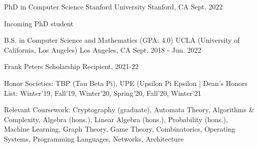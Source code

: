 

\begin{cventries}

\resumeentry
    {PhD in Computer Science} %
    {Stanford University} %
    {Stanford, CA} %
    {Sept. 2022} %
    {
      \begin{cvitems} %
        \item {Incoming PhD student}
      \end{cvitems}
    }

  \resumeentry
    {B.S. in Computer Science and Mathematics (GPA: 4.0)} %
    {UCLA (University of California, Los Angeles)} %
    {Los Angeles, CA} %
    {Sept. 2018 - Jun. 2022} %
    {
      \begin{cvitems} %
        \item {Frank Peters Scholarship Recipient, 2021-22}
        \item {Honor Societies: TBP (Tau Beta Pi), UPE (Upsilon Pi Epsilon | Dean's Honors List: Winter'19, Fall'19, Winter'20, Spring'20, Fall'20, Winter'21}
        \item {Relevant Coursework: Cryptography (graduate), Automata Theory, Algorithms \& Complexity, Algebra (hons.), Linear Algebra (hons.), Probability (hons.), Machine Learning, Graph Theory, Game Theory, Combinatorics, Operating Systems, Programming Languages, Networks, Architecture}
      \end{cvitems}
    }
\end{cventries}
